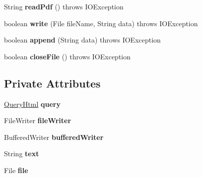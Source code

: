 \begin{DoxyCompactItemize}
\hypertarget{classcom_1_1zeuslearning_1_1automation_1_1io_1_1TextFileOps_aa2388c14dd9d4b34e361fe66c9567152}{}\label{classcom_1_1zeuslearning_1_1automation_1_1io_1_1TextFileOps_aa2388c14dd9d4b34e361fe66c9567152} 
String {\bfseries read\+Pdf} ()  throws I\+O\+Exception 
\item 
\hypertarget{classcom_1_1zeuslearning_1_1automation_1_1io_1_1TextFileOps_a52c6c6ecb5cb32e80db463d03aa89904}{}\label{classcom_1_1zeuslearning_1_1automation_1_1io_1_1TextFileOps_a52c6c6ecb5cb32e80db463d03aa89904} 
boolean {\bfseries write} (File file\+Name, String data)  throws I\+O\+Exception 
\item 
\hypertarget{classcom_1_1zeuslearning_1_1automation_1_1io_1_1TextFileOps_a57b949fbbf1d9e2adf7988bf16902501}{}\label{classcom_1_1zeuslearning_1_1automation_1_1io_1_1TextFileOps_a57b949fbbf1d9e2adf7988bf16902501} 
boolean {\bfseries append} (String data)  throws I\+O\+Exception 
\item 
\hypertarget{classcom_1_1zeuslearning_1_1automation_1_1io_1_1TextFileOps_a83d38cfb24b88a207ea8899bf037cae1}{}\label{classcom_1_1zeuslearning_1_1automation_1_1io_1_1TextFileOps_a83d38cfb24b88a207ea8899bf037cae1} 
boolean {\bfseries close\+File} ()  throws I\+O\+Exception 
\end{DoxyCompactItemize}
\subsection*{Private Attributes}
\begin{DoxyCompactItemize}
\item 
\hypertarget{classcom_1_1zeuslearning_1_1automation_1_1io_1_1TextFileOps_a2db9a2678862c2dc67ebd6e8e83973c0}{}\label{classcom_1_1zeuslearning_1_1automation_1_1io_1_1TextFileOps_a2db9a2678862c2dc67ebd6e8e83973c0} 
\hyperlink{classcom_1_1zeuslearning_1_1automation_1_1selenium_1_1interactions_1_1QueryHtml}{Query\+Html} {\bfseries query}
\item 
\hypertarget{classcom_1_1zeuslearning_1_1automation_1_1io_1_1TextFileOps_abe758b909bbcb1ca7599613cfa910fd7}{}\label{classcom_1_1zeuslearning_1_1automation_1_1io_1_1TextFileOps_abe758b909bbcb1ca7599613cfa910fd7} 
File\+Writer {\bfseries file\+Writer}
\item 
\hypertarget{classcom_1_1zeuslearning_1_1automation_1_1io_1_1TextFileOps_a0126c6df25dc4eb62d22e5270914228e}{}\label{classcom_1_1zeuslearning_1_1automation_1_1io_1_1TextFileOps_a0126c6df25dc4eb62d22e5270914228e} 
Buffered\+Writer {\bfseries buffered\+Writer}
\item 
\hypertarget{classcom_1_1zeuslearning_1_1automation_1_1io_1_1TextFileOps_a36dcd5d6a901d1dbde306b3971b5716d}{}\label{classcom_1_1zeuslearning_1_1automation_1_1io_1_1TextFileOps_a36dcd5d6a901d1dbde306b3971b5716d} 
String {\bfseries text}
\item 
\hypertarget{classcom_1_1zeuslearning_1_1automation_1_1io_1_1TextFileOps_a4d44dc53062a0c59fd480674997e23f6}{}\label{classcom_1_1zeuslearning_1_1automation_1_1io_1_1TextFileOps_a4d44dc53062a0c59fd480674997e23f6} 
File {\bfseries file}
\end{DoxyCompactItemize}
